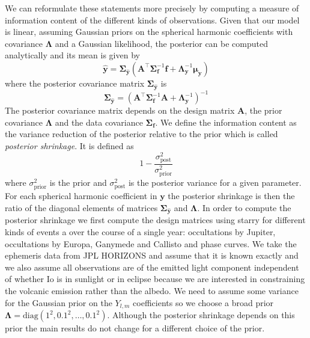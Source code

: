 \documentclass[modern]{aastex62}
\begin{document}
We can reformulate these statements more precisely by computing a measure of information content of the different kinds of observations.
Given that our model is linear, assuming Gaussian priors on the spherical harmonic coefficients with covariance $\boldsymbol{\Lambda}$ and a Gaussian likelihood, the posterior can be computed analytically and its mean is given by
\begin{equation}
    \widehat{\mathbf{y}}=\boldsymbol{\Sigma}_{\hat{\mathbf{y}}}\left(\mathbf{A}^{\top} \boldsymbol{\Sigma}_{\mathbf{f}}^{-1} \mathbf{f}+\boldsymbol{\Lambda}_{\mathbf{y}}^{-1} \boldsymbol{\mu}_{\mathbf{y}}\right)
\end{equation}
where the posterior covariance matrix $\boldsymbol{\Sigma}_{\hat{\mathbf{y}}}$ is 
\begin{equation}
\boldsymbol{\Sigma}_{\hat{\mathbf{y}}}=\left( \mathbf{A}^{\top} \boldsymbol{\Sigma}_{\mathbf{f}}^{-1} \mathbf{A} +\boldsymbol{\Lambda}_{\mathbf{y}}^{-1}\right)^{-1}
\end{equation}
The posterior covariance matrix depends on the design matrix $\mathbf{A}$, the prior covariance  $\boldsymbol{\Lambda}$ and the data covariance $\boldsymbol{\Sigma}_{\mathbf{f}}$.
We define the information content as the variance reduction of the posterior relative to the prior which is called \emph{posterior shrinkage}.
It is defined as
\begin{equation}
    1-\frac{\sigma^2_\mathrm{post}}{\sigma^2_\mathrm{prior}}
\end{equation}
where $\sigma^2_\mathrm{prior}$ is the prior and $\sigma^2_\mathrm{post}$ is the posterior variance for a given parameter.
For each spherical harmonic coefficient in $\mathbf{y}$ the posterior shrinkage is then the ratio of the diagonal elements of matrices $\boldsymbol{\Sigma}_{\hat{\mathbf{y}}}$ and $\boldsymbol{\Lambda}$.
In order to compute the posterior shrinkage we first compute the design matrices using \textsf{starry} for different kinds of events a over the course of a single year: occultations by Jupiter, occultations by Europa, Ganymede and Callisto and phase curves.
We take the ephemeris data from \textsf{JPL HORIZONS} and assume that it is known exactly and we also assume all observations are of the emitted light component independent of whether Io is in sunlight or in eclipse because we are interested in constraining the volcanic emission rather than the albedo.
We need to assume some variance for the Gaussian prior on the $Y_{l,m}$ coefficients so we choose a broad prior $\boldsymbol{\Lambda}=\mathrm{diag}(1^2,0.1^2,\dots,0.1^2)$.
Although the posterior shrinkage depends on this prior the main results do not change for a different choice of the prior.
\end{document}
